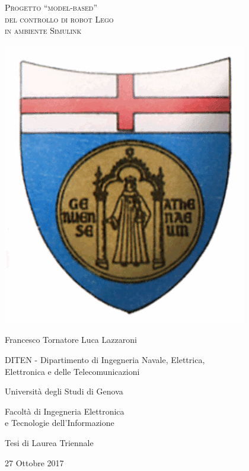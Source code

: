 \documentclass[a4paper,11pt,twoside]{book}
\begin{document}
\thispagestyle{empty}
\begin{center}
	\begin{Huge}
		\textsc{Progetto ``model-based''\\
				del controllo di robot Lego\\
				in ambiente Simulink\\}
	\end{Huge}
\end{center}
\vfill
\begin{center}
	\includegraphics[scale=0.35]{logo_unige.png}
\end{center}
\vfill
\begin{center}
	{\LARGE Francesco Tornatore Luca Lazzaroni}
\end{center}

\begin{center}
	{\Large DITEN - Dipartimento di Ingegneria Navale, Elettrica,\\
	Elettronica e delle Telecomunicazioni}
\end{center}
\begin{center}
	{\Large Università degli Studi di Genova}	
\end{center}
\begin{center}
	{\Large Facoltà di Ingegneria Elettronica\\ e Tecnologie dell'Informazione}	
\end{center}
\vfill
\begin{center}
	{\large Tesi di Laurea Triennale}
\end{center}
\begin{center}
	{\large 27 Ottobre 2017}
\end{center}
\end{document}

